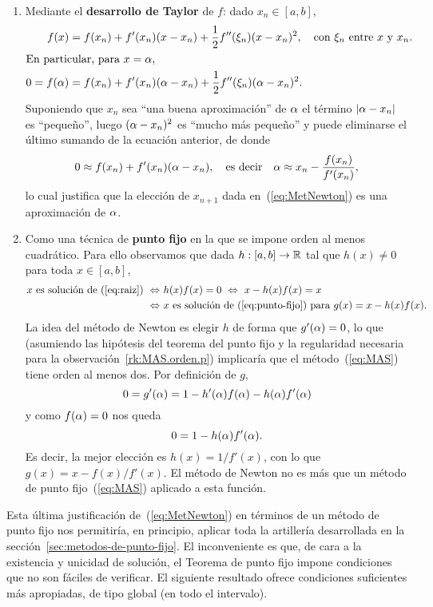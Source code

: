 \begin{enumerate}
\item Mediante el \textbf{desarrollo de Taylor} de $f$: dado $x_n\in [a,b]$,
  \begin{align*}
    f(x)&=f(x_n) + f'(x_n)(x-x_n) + \frac 12 f''(\xi_n)(x-x_n)^2, \quad
    \text{con $\xi_n$ entre $x$ y $x_n$}.
    \\
    \intertext{En particular, para $x=\alpha$,}
    0=f(\alpha)&=f(x_n) + f'(x_n)(\alpha-x_n) + \frac 12 f''(\xi_n)(\alpha-x_n)^2.
  \end{align*}
  Suponiendo que $x_n$ sea ``una buena aproximación'' de $\alpha$ el
  término $|\alpha-x_n|$ es ``pequeño'', luego $(\alpha-x_n)^2$ es
  ``mucho más pequeño'' y puede eliminarse el último sumando de la
  ecuación anterior, de donde
  \begin{equation*}
        0 \approx f(x_n) + f'(x_n)(\alpha-x_n), \quad \text{es decir} \quad
        \alpha \approx x_n - \frac{f(x_n)}{f'(x_n)},
  \end{equation*}
  lo cual justifica que la elección de $x_{n+1}$ dada
  en~(\ref{eq:MetNewton}) es una aproximación de $\alpha$.
\item Como una técnica de \textbf{punto fijo} en la que se impone
  orden al menos cuadrático. %
  Para ello observamos que dada $h:[a,b]\to\operatorname{{\mathbb R}}$ tal que $h(x)\neq 0$
  para toda $x\in[a,b]$,
  \begin{align*}
    x \text{ es solución de~(\ref{eq:raiz})} \ \Leftrightarrow\ & h(x)f(x)=0 
    \ \Leftrightarrow\ x-h(x)f(x)=x \\
    \ \Leftrightarrow\ & x \text{ es solución de~(\ref{eq:punto-fijo}) para }
    g(x)=x-h(x)f(x).
  \end{align*}
  La idea del método de Newton es elegir $h$ de forma que
  $g'(\alpha)=0$, lo que (asumiendo las hipótesis del teorema del punto
  fijo y la regularidad necesaria para la
  observación~\ref{rk:MAS.orden.p}) implicaría que el
  método~(\ref{eq:MAS}) tiene orden al menos dos. Por definición de
  $g$,
  $$
  0 = g'(\alpha) = 1-h'(\alpha)f(\alpha)-h(\alpha)f'(\alpha)
  $$
  y como $f(\alpha)=0$ nos queda 
  $$
  0 = 1-h(\alpha)f'(\alpha).
  $$
  Es decir, la mejor elección es $h(x)=1/f'(x)$, con lo que
  $g(x)=x-f(x)/f'(x)$. El método de Newton no es más
  que un método de punto fijo~(\ref{eq:MAS}) aplicado a esta función.
\end{enumerate}

Esta última justificación de~(\ref{eq:MetNewton}) en términos de un
método de punto fijo nos permitiría, en principio, aplicar toda la
artillería desarrollada en la
sección~\ref{sec:metodos-de-punto-fijo}. El inconveniente es que, de
cara a la existencia y unicidad de solución, el Teorema de punto fijo
impone condiciones que no son fáciles de verificar.  El siguiente
resultado ofrece condiciones suficientes más apropiadas, de tipo
global (en todo el intervalo).


